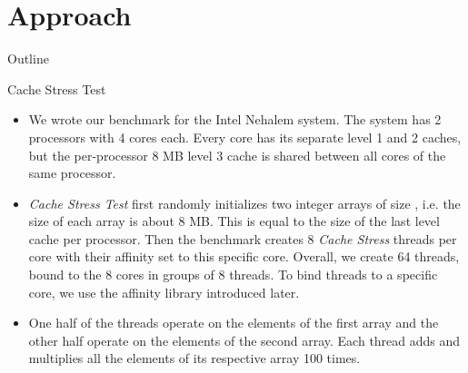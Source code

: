 \section{Approach}

\begin{frame}{Outline}
  \tableofcontents[current]
\end{frame}


\begin{frame}{Cache Stress Test}
  \begin{itemize}
  \item We wrote our benchmark for the Intel Nehalem system. The
    system has 2 processors with 4 cores each. Every core has its
    separate level 1 and 2 caches, but the per-processor 8 MB level 3
    cache is shared between all cores of the same processor.
  \item \emph{Cache Stress Test} first randomly initializes two
    integer arrays of size , i.e. the size of each
    array is about 8 MB. This is equal to the size of the last level
    cache per processor. Then the benchmark creates 8 \emph{Cache
      Stress} threads per core with their affinity set to this
    specific core. Overall, we create 64 threads, bound to the 8 cores
    in groups of 8 threads. To bind threads to a specific core, we use
    the affinity library introduced later.
  \item One half of the threads operate on the elements of the first
    array and the other half operate on the elements of the second
    array. Each thread adds and multiplies all the elements of its
    respective array 100 times.
  \end{itemize}
\end{frame}

